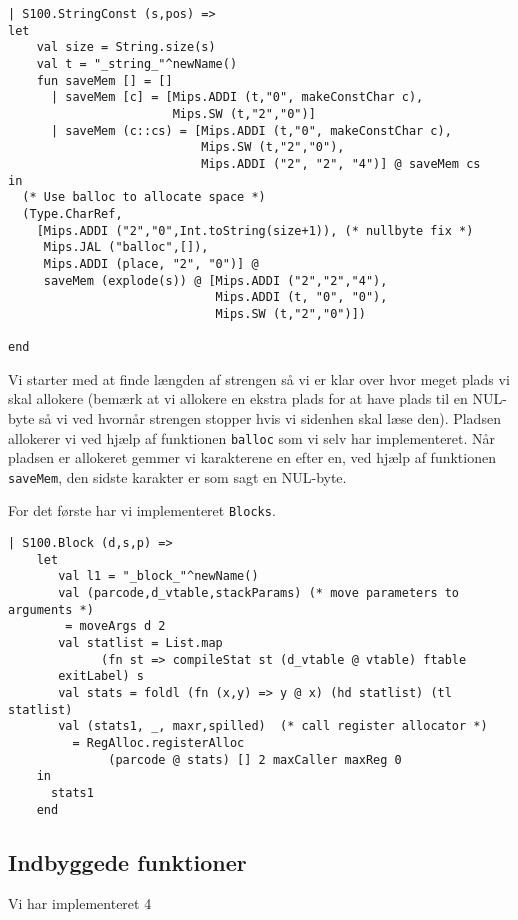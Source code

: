 \documentclass[12pt]{article}
\begin{document}
\begin{verbatim}
| S100.StringConst (s,pos) =>
let
    val size = String.size(s)
    val t = "_string_"^newName()
    fun saveMem [] = []
      | saveMem [c] = [Mips.ADDI (t,"0", makeConstChar c),
                       Mips.SW (t,"2","0")]
      | saveMem (c::cs) = [Mips.ADDI (t,"0", makeConstChar c),
                           Mips.SW (t,"2","0"),
                           Mips.ADDI ("2", "2", "4")] @ saveMem cs
in 
  (* Use balloc to allocate space *)
  (Type.CharRef,
    [Mips.ADDI ("2","0",Int.toString(size+1)), (* nullbyte fix *)
     Mips.JAL ("balloc",[]), 
     Mips.ADDI (place, "2", "0")] @
     saveMem (explode(s)) @ [Mips.ADDI ("2","2","4"),
                             Mips.ADDI (t, "0", "0"),
                             Mips.SW (t,"2","0")])              
           
end
\end{verbatim}

Vi starter med at finde længden af strengen så vi er klar over hvor meget plads
vi skal allokere (bemærk at vi allokere en ekstra
plads for at have plads til en NUL-byte så vi ved hvornår strengen stopper hvis
vi sidenhen skal læse den). Pladsen allokerer vi ved hjælp af funktionen
\texttt{balloc} som vi selv har implementeret. Når pladsen er allokeret gemmer
vi karakterene en efter en, ved hjælp af funktionen \texttt{saveMem}, den sidste
karakter er som sagt en NUL-byte. 

For det første har vi implementeret \texttt{Blocks}. 

\begin{verbatim}
| S100.Block (d,s,p) => 
    let
       val l1 = "_block_"^newName()
       val (parcode,d_vtable,stackParams) (* move parameters to arguments *)
        = moveArgs d 2
       val statlist = List.map 
             (fn st => compileStat st (d_vtable @ vtable) ftable
       exitLabel) s
       val stats = foldl (fn (x,y) => y @ x) (hd statlist) (tl statlist)
       val (stats1, _, maxr,spilled)  (* call register allocator *)
         = RegAlloc.registerAlloc
              (parcode @ stats) [] 2 maxCaller maxReg 0
    in
      stats1
    end
\end{verbatim}


\subsection{Indbyggede funktioner}
Vi har implementeret 4 
\end{document}
